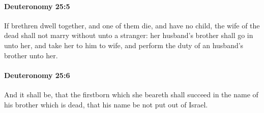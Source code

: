 		\paragraph{Deuteronomy 25:5} %
			\label{DEUTERONOMY-25-5}

			If brethren dwell together, and one of them die, and have no child, the wife of the dead shall not marry without unto a stranger: her husband's brother shall go in unto her, and take her to him to wife, and perform the duty of an husband's brother unto her.


		\paragraph{Deuteronomy 25:6} %
			\label{DEUTERONOMY-25-6}

			And it shall be, that the firstborn which she beareth shall succeed in the name of his brother which is dead, that his name be not put out of Israel.

